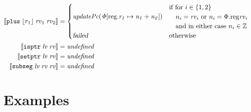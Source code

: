 \documentclass{article}
\newcommand{\update}[2]{[#1 \mapsto #2]}
\newcommand{\sem}[1]{\left\llbracket #1 \right\rrbracket}
\newcommand{\undefined}{\mathit{undefined}}
\newcommand{\var}[1]{\mathit{#1}}
\newcommand{\rv}{\var{rv}}
\newcommand{\lv}{\var{lv}}
\newcommand{\plainproj}[1]{\mathrm{#1}}
\newcommand{\memreg}[1][\Phi]{#1.\plainproj{reg}}
\newcommand{\updateReg}[3][\Phi]{#1\update{\plainproj{reg}.#2}{#3}}
\newcommand{\failed}{\textsl{failed}}
\newcommand{\plainfun}[1]{\mathit{#1}}
\newcommand{\stdUpdatePc}[1]{\plainfun{updatePc(#1)}}
\newcommand{\ints}{\mathbb{Z}}
\newcommand{\refreg}[1]{\lfloor #1 \rfloor}
\newcommand{\instr}[1]{\mathtt{#1}}
\newcommand{\twoinstr}[3]{\instr{#1} \; #2 \; #3}
\newcommand{\isptr}[2]{\twoinstr{isptr}{#1}{#2}}
\newcommand{\setptr}[2]{\twoinstr{setptr}{#1}{#2}}
\newcommand{\threeinstr}[4]{\instr{#1} \; #2 \; #3 \; #4}
\newcommand{\subseg}[3]{\threeinstr{subseg}{#1}{#2}{#3}}
\newcommand{\plus}[3]{\threeinstr{plus}{#1}{#2}{#3}}
\begin{document}
\begin{align*}
  \sem{\plus{\refreg{r_1}}{\rv_1}{\rv_2}}               & =
                                                          \begin{cases}
                                                            \stdUpdatePc{\updateReg{r_1}{n_1+n_2}} &
                                                            \arraycolsep=0pt
                                                            \begin{array}{l}
                                                              \text{if for $i \in \{1,2\}$}\\
                                                              \quad\text{$n_i = \rv_i$ or $n_i = \memreg{\rv_i}$}\\
                                                              \quad\text{and in either case $n_i \in \ints$}
                                                            \end{array}\\
                                                            \failed & \text{otherwise}
                                                          \end{cases}\\
  \sem{\isptr{\lv}{\rv}} & = \undefined \\ 
  \sem{\setptr{\lv}{\rv}} & = \undefined \\ 
  \sem{\subseg{\lv}{\rv}{\rv}} & = \undefined 
\end{align*}

\section{Examples}
\label{sec:examples}
\end{document}
